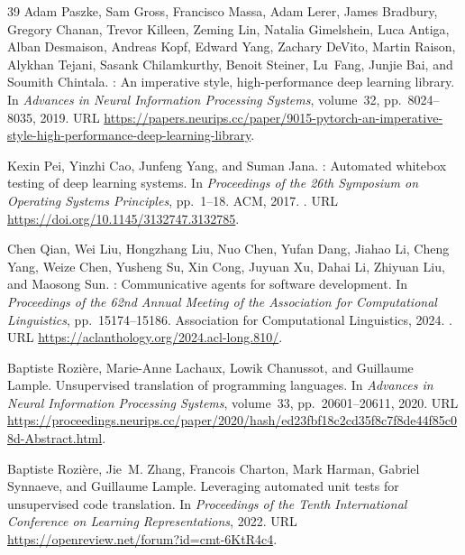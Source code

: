 \documentclass{article}
\begin{document}
\begin{thebibliography}{39}
Adam Paszke, Sam Gross, Francisco Massa, Adam Lerer, James Bradbury, Gregory
  Chanan, Trevor Killeen, Zeming Lin, Natalia Gimelshein, Luca Antiga, Alban
  Desmaison, Andreas Kopf, Edward Yang, Zachary DeVito, Martin Raison, Alykhan
  Tejani, Sasank Chilamkurthy, Benoit Steiner, Lu~Fang, Junjie Bai, and Soumith
  Chintala.
: An imperative style, high-performance deep learning
  library.
\newblock In \emph{Advances in Neural Information Processing Systems},
  volume~32, pp.\  8024--8035, 2019.
\newblock URL
  \url{https://papers.neurips.cc/paper/9015-pytorch-an-imperative-style-high-performance-deep-learning-library}.

Kexin Pei, Yinzhi Cao, Junfeng Yang, and Suman Jana.
: Automated whitebox testing of deep learning systems.
\newblock In \emph{Proceedings of the 26th Symposium on Operating Systems
  Principles}, pp.\  1--18. ACM, 2017.
\newblock {}.
\newblock URL \url{https://doi.org/10.1145/3132747.3132785}.

Chen Qian, Wei Liu, Hongzhang Liu, Nuo Chen, Yufan Dang, Jiahao Li, Cheng Yang,
  Weize Chen, Yusheng Su, Xin Cong, Juyuan Xu, Dahai Li, Zhiyuan Liu, and
  Maosong Sun.
: Communicative agents for software development.
\newblock In \emph{Proceedings of the 62nd Annual Meeting of the Association
  for Computational Linguistics}, pp.\  15174--15186. Association for
  Computational Linguistics, 2024.
\newblock {}.
\newblock URL \url{https://aclanthology.org/2024.acl-long.810/}.

Baptiste Rozi{\`e}re, Marie-Anne Lachaux, Lowik Chanussot, and Guillaume
  Lample.
\newblock Unsupervised translation of programming languages.
\newblock In \emph{Advances in Neural Information Processing Systems},
  volume~33, pp.\  20601--20611, 2020.
\newblock URL
  \url{https://proceedings.neurips.cc/paper/2020/hash/ed23fbf18c2cd35f8c7f8de44f85c08d-Abstract.html}.

Baptiste Rozi{\`e}re, Jie~M. Zhang, Francois Charton, Mark Harman, Gabriel
  Synnaeve, and Guillaume Lample.
\newblock Leveraging automated unit tests for unsupervised code translation.
\newblock In \emph{Proceedings of the Tenth International Conference on
  Learning Representations}, 2022.
\newblock URL \url{https://openreview.net/forum?id=cmt-6KtR4c4}.


\end{thebibliography}
\end{document}

